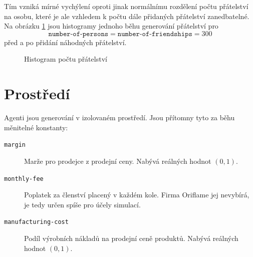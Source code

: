 \documentclass[a4wide,12pt]{report}
\begin{document}
Tím vzniká mírné vychýlení oproti jinak normálnímu rozdělení počtu přátelství na osobu, které je ale vzhledem k počtu dále přidaných přátelství zanedbatelné. Na obrázku \ref{fig:hist_fr} jsou histogramy jednoho běhu generování přátelství pro \[\texttt{number-of-persons}=\texttt{number-of-friendships}=300\] před a po přidání náhodných přátelství.\\
\begin{figure}[h]
  \centering
  \caption{Histogram počtu přátelství}
  \label{fig:hist_fr}
\end{figure}
\section{Prostředí}
Agenti jsou generování v izolovaném prostředí. Jsou přítomny tyto za běhu měnitelné konstanty:
\begin{description}
\item[\texttt{margin}] Marže pro prodejce z prodejní ceny. Nabývá reálných hodnot $(0,1)$.
\item[\texttt{monthly-fee}] Poplatek za členství placený v každém kole. Firma Oriflame jej nevybírá, je tedy určen spíše pro účely simulací.
\item[\texttt{manufacturing-cost}] Podíl výrobních nákladů na prodejní ceně produktů. Nabývá reálných hodnot $(0,1)$.
\end{description}
\end{document}
